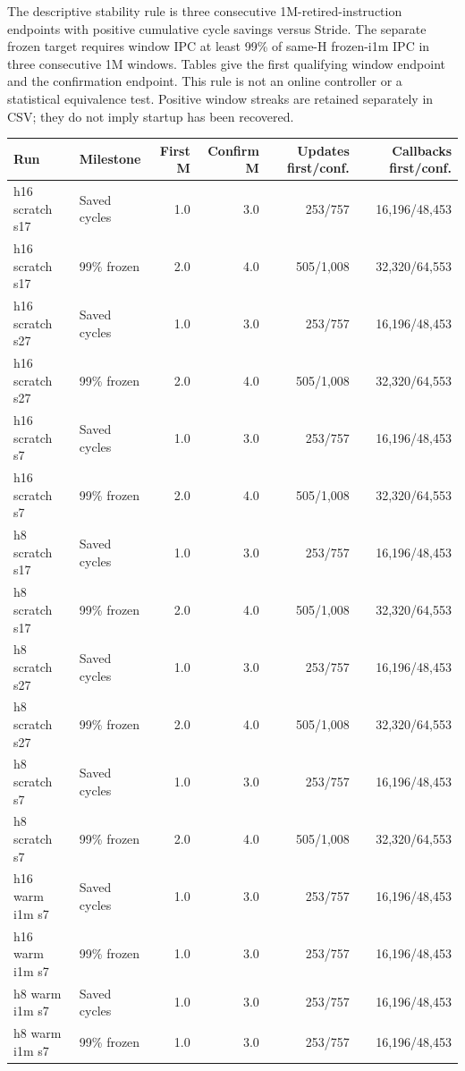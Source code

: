 \documentclass[10pt]{article}
\begin{document}
The descriptive stability rule is three consecutive 1M-retired-instruction endpoints with positive cumulative cycle savings versus Stride. The separate frozen target requires window IPC at least 99\% of same-H frozen-i1m IPC in three consecutive 1M windows. Tables give the first qualifying window endpoint and the confirmation endpoint. This rule is not an online controller or a statistical equivalence test. Positive window streaks are retained separately in CSV; they do not imply startup has been recovered.

\begin{center}
\scriptsize
\begin{longtable}{llrrrr}
\toprule
Run & Milestone & First M & Confirm M & Updates first/conf. & Callbacks first/conf. \\
\midrule
\endhead
h16 scratch s17 & Saved cycles & 1.0 & 3.0 & 253/757 & 16,196/48,453 \\
h16 scratch s17 & 99\% frozen & 2.0 & 4.0 & 505/1,008 & 32,320/64,553 \\
h16 scratch s27 & Saved cycles & 1.0 & 3.0 & 253/757 & 16,196/48,453 \\
h16 scratch s27 & 99\% frozen & 2.0 & 4.0 & 505/1,008 & 32,320/64,553 \\
h16 scratch s7 & Saved cycles & 1.0 & 3.0 & 253/757 & 16,196/48,453 \\
h16 scratch s7 & 99\% frozen & 2.0 & 4.0 & 505/1,008 & 32,320/64,553 \\
h8 scratch s17 & Saved cycles & 1.0 & 3.0 & 253/757 & 16,196/48,453 \\
h8 scratch s17 & 99\% frozen & 2.0 & 4.0 & 505/1,008 & 32,320/64,553 \\
h8 scratch s27 & Saved cycles & 1.0 & 3.0 & 253/757 & 16,196/48,453 \\
h8 scratch s27 & 99\% frozen & 2.0 & 4.0 & 505/1,008 & 32,320/64,553 \\
h8 scratch s7 & Saved cycles & 1.0 & 3.0 & 253/757 & 16,196/48,453 \\
h8 scratch s7 & 99\% frozen & 2.0 & 4.0 & 505/1,008 & 32,320/64,553 \\
h16 warm i1m s7 & Saved cycles & 1.0 & 3.0 & 253/757 & 16,196/48,453 \\
h16 warm i1m s7 & 99\% frozen & 1.0 & 3.0 & 253/757 & 16,196/48,453 \\
h8 warm i1m s7 & Saved cycles & 1.0 & 3.0 & 253/757 & 16,196/48,453 \\
h8 warm i1m s7 & 99\% frozen & 1.0 & 3.0 & 253/757 & 16,196/48,453 \\
\bottomrule
\end{longtable}
\end{center}
\end{document}
